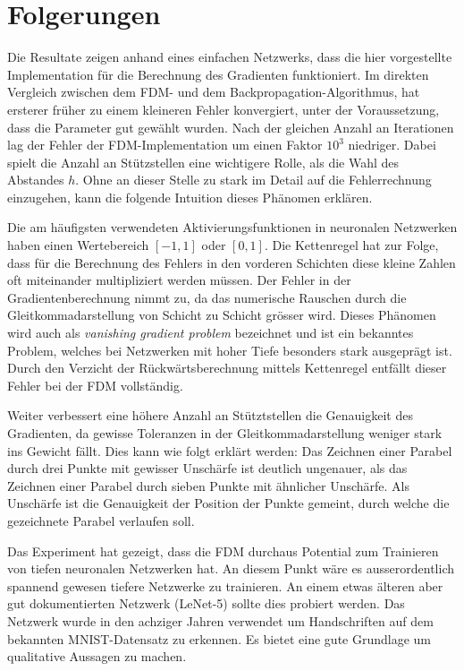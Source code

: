%
%
%
\section{Folgerungen
\label{ableitung:section:folgerungen}}
Die Resultate zeigen anhand eines einfachen Netzwerks, dass die hier
vorgestellte Implementation für die Berechnung des Gradienten funktioniert.
Im direkten Vergleich zwischen dem FDM- und dem
Backpropagation-Algorithmus, hat ersterer früher zu einem kleineren
Fehler konvergiert, unter der Voraussetzung,
dass die Parameter gut gewählt wurden.
Nach der gleichen Anzahl an Iterationen lag der Fehler der FDM-Implementation um einen Faktor $10^3$ niedriger.
Dabei spielt die Anzahl an Stützstellen eine wichtigere Rolle, als die Wahl des Abstandes $h$.
Ohne an dieser Stelle zu stark im Detail auf die Fehlerrechnung einzugehen, kann die folgende Intuition dieses Phänomen erklären.

Die am häufigsten verwendeten Aktivierungsfunktionen in neuronalen
Netzwerken haben einen Wertebereich $[-1, 1]$ oder $[0, 1]$.
Die Kettenregel hat zur Folge, dass für die Berechnung des Fehlers
in den vorderen Schichten diese kleine Zahlen oft miteinander
multipliziert werden müssen.
%
Der Fehler in der Gradientenberechnung nimmt zu, da das numerische
Rauschen durch die Gleitkommadarstellung von Schicht zu Schicht
grösser wird.
Dieses Phänomen wird auch als {\em vanishing gradient problem}
bezeichnet und ist ein bekanntes Problem, welches bei Netzwerken
mit hoher Tiefe besonders stark ausgeprägt ist.
%
Durch den Verzicht der Rückwärtsberechnung mittels Kettenregel entfällt
dieser Fehler bei der FDM vollständig. 

Weiter verbessert eine höhere Anzahl an Stütztstellen die Genauigkeit des
Gradienten, da gewisse Toleranzen in der Gleitkommadarstellung weniger
stark ins Gewicht fällt.
Dies kann wie folgt erklärt werden: Das Zeichnen einer Parabel durch drei Punkte mit gewisser Unschärfe ist deutlich ungenauer, als das Zeichnen einer Parabel durch sieben Punkte mit ähnlicher Unschärfe.
Als Unschärfe ist die Genauigkeit der Position der Punkte gemeint, durch welche die gezeichnete Parabel verlaufen soll.

Das Experiment hat gezeigt, dass die FDM durchaus Potential zum Trainieren
von tiefen neuronalen Netzwerken hat.
An diesem Punkt wäre es ausserordentlich spannend gewesen tiefere Netzwerke zu trainieren.
An einem etwas älteren aber gut dokumentierten Netzwerk (LeNet-5)
sollte dies probiert werden.
Das Netzwerk wurde in den achziger Jahren verwendet um Handschriften
auf dem bekannten MNIST-Datensatz zu erkennen.
%
Es bietet eine gute Grundlage um qualitative Aussagen zu machen.

